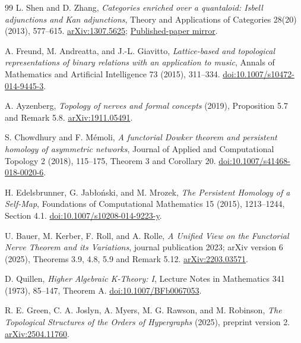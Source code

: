 \documentclass[11pt]{article}
\theoremstyle{remark}
\begin{document}
\begin{thebibliography}{99}
L. Shen and D. Zhang, \emph{Categories enriched over a quantaloid:
Isbell adjunctions and Kan adjunctions}, Theory and Applications of
Categories 28(20) (2013), 577--615.
\href{https://arxiv.org/abs/1307.5625}{arXiv:1307.5625};
\href{https://emis.de/ft/8978}{Published-paper mirror}.

A. Freund, M. Andreatta, and J.-L. Giavitto,
\emph{Lattice-based and topological representations of binary relations
with an application to music}, Annals of Mathematics and Artificial
Intelligence 73 (2015), 311--334.
\href{https://doi.org/10.1007/s10472-014-9445-3}{doi:10.1007/s10472-014-9445-3}.

A. Ayzenberg, \emph{Topology of nerves and formal concepts} (2019),
Proposition 5.7 and Remark 5.8.
\href{https://arxiv.org/abs/1911.05491}{arXiv:1911.05491}.

S. Chowdhury and F. M\'emoli,
\emph{A functorial Dowker theorem and persistent homology of asymmetric
networks}, Journal of Applied and Computational Topology 2 (2018),
115--175, Theorem 3 and Corollary 20.
\href{https://doi.org/10.1007/s41468-018-0020-6}{doi:10.1007/s41468-018-0020-6}.

H. Edelsbrunner, G. Jab\l o\'nski, and M. Mrozek,
\emph{The Persistent Homology of a Self-Map}, Foundations of Computational
Mathematics 15 (2015), 1213--1244, Section 4.1.
\href{https://doi.org/10.1007/s10208-014-9223-y}{doi:10.1007/s10208-014-9223-y}.

U. Bauer, M. Kerber, F. Roll, and A. Rolle,
\emph{A Unified View on the Functorial Nerve Theorem and its Variations},
journal publication 2023; arXiv version 6 (2025), Theorems 3.9, 4.8, 5.9
and Remark 5.12.
\href{https://arxiv.org/abs/2203.03571}{arXiv:2203.03571}.

D. Quillen, \emph{Higher Algebraic K-Theory: I}, Lecture Notes in
Mathematics 341 (1973), 85--147, Theorem A.
\href{https://doi.org/10.1007/BFb0067053}{doi:10.1007/BFb0067053}.

R. E. Green, C. A. Joslyn, A. Myers, M. G. Rawson, and M. Robinson,
\emph{The Topological Structures of the Orders of Hypergraphs} (2025),
preprint version 2.
\href{https://arxiv.org/abs/2504.11760}{arXiv:2504.11760}.
\end{thebibliography}
\end{document}
